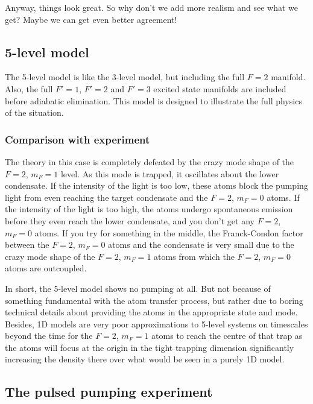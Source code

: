 Anyway, things look great. So why don't we add more realism and see what we get? Maybe we can get even better agreement!

\subsection{5-level model}

The 5-level model is like the 3-level model, but including the full $F=2$ manifold.  Also, the full $F'=1$, $F'=2$ and $F'=3$ excited state manifolds are included before adiabatic elimination.  This model is designed to illustrate the full physics of the situation.  

\subsubsection{Comparison with experiment}

The theory in this case is completely defeated by the crazy mode shape of the $F=2$, $m_F=1$ level.  As this mode is trapped, it oscillates about the lower condensate.  If the intensity of the light is too low, these atoms block the pumping light from even reaching the target condensate and the $F=2$, $m_F=0$ atoms.  If the intensity of the light is too high, the atoms undergo spontaneous emission before they even reach the lower condensate, and you don't get any $F=2$, $m_F=0$ atoms.  If you try for something in the middle, the Franck-Condon factor between the $F=2$, $m_F=0$ atoms and the condensate is very small due to the crazy mode shape of the $F=2$, $m_F=1$ atoms from which the $F=2$, $m_F=0$ atoms are outcoupled.

In short, the 5-level model shows no pumping at all. But not because of something fundamental with the atom transfer process, but rather due to boring technical details about providing the atoms in the appropriate state and mode.  Besides, 1D models are very poor approximations to 5-level systems on timescales beyond the time for the $F=2$, $m_F=1$ atoms to reach the centre of that trap as the atoms will focus at the origin in the tight trapping dimension significantly increasing the density there over what would be seen in a purely 1D model.

\subsection{The pulsed pumping experiment}


